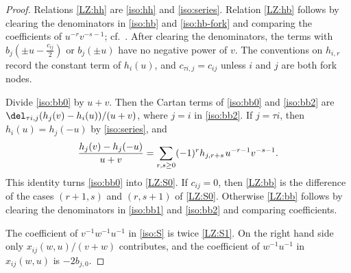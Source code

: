 \documentclass{amsart}
\numberwithin{equation}{section}
\theoremstyle{remark}
\renewcommand{\,}{\kern 0.1em} %
\begin{document}
\begin{proof}
%
Relations \eqref{LZ:hh} are \eqref{iso:hh} and \eqref{iso:series}. Relation \eqref{LZ:hb} follows
by clearing the denominators in \eqref{iso:hb} and \eqref{iso:hb-fork} and comparing the
coefficients of $u^{-r}v^{-s-1}$; cf.~\cite[(3.22)]{LZ25}. After clearing the denominators, the
terms with $b_j(\pm u-\frac{c_{ij}}{2})$ or $b_j(\pm u)$ have no negative power of $v$. The
conventions on $h_{i,r}$ record the constant term of $h_i(u)$, and $c_{\tau i,j}=c_{ij}$ unless $i$
and $j$ are both fork nodes.

Divide \eqref{iso:bb0} by $u+v$. Then the Cartan terms of \eqref{iso:bb0} and \eqref{iso:bb2} are
$\del_{\tau i,j}(h_j(v)-h_i(u))/(u+v)$, where $j=i$ in \eqref{iso:bb2}. If $j=\tau i$, then
$h_i(u)=h_j(-u)$ by \eqref{iso:series}, and
%
\[
\frac{h_j(v)-h_j(-u)}{u+v} = \sum_{r,s\ge0}(-1)^r h_{j,r+s}\,u^{-r-1}v^{-s-1} .
\]
%
This identity turns \eqref{iso:bb0} into \eqref{LZ:S0}. If $c_{ij}=0$, then \eqref{LZ:bb} is the
difference of the cases $(r+1,s)$ and $(r,s+1)$ of \eqref{LZ:S0}. Otherwise \eqref{LZ:bb} follows by
clearing the denominators in \eqref{iso:bb1} and \eqref{iso:bb2} and comparing coefficients.

The coefficient of $v^{-1}w^{-1}u^{-1}$ in \eqref{iso:S} is twice \eqref{LZ:S1}. On the right
hand side only $x_{ij}(w,u)/(v+w)$ contributes, and the coefficient of $w^{-1}u^{-1}$ in
$x_{ij}(w,u)$ is $-2b_{j,0}$.
%
\end{proof}
\end{document}

